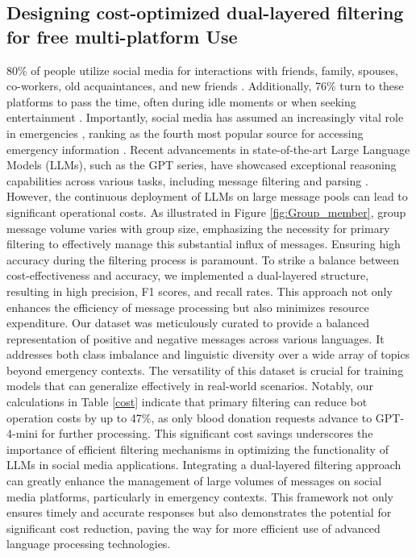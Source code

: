 \documentclass[11pt]{article}
\begin{document}
\subsection{Designing cost-optimized dual-layered filtering for free multi-platform Use}
 80\% of people utilize social media for interactions with friends, family, spouses, co-workers, old acquaintances, and new friends \cite{28whiting2013people}. Additionally, 76\% turn to these platforms to pass the time, often during idle moments or when seeking entertainment \cite{28whiting2013people}. Importantly, social media has assumed an increasingly vital role in emergencies \cite{29lindsay2011social}, ranking as the fourth most popular source for accessing emergency information \cite{29lindsay2011social}. Recent advancements in state-of-the-art Large Language Models (LLMs), such as the GPT series, have showcased exceptional reasoning capabilities across various tasks, including message filtering and parsing \cite{30huang2024text}. However, the continuous deployment of LLMs on large message pools can lead to significant operational costs. As illustrated in Figure \ref{fig:Group_member}, group message volume varies with group size, emphasizing the necessity for primary filtering to effectively manage this substantial influx of messages. Ensuring high accuracy during the filtering process is paramount. To strike a balance between cost-effectiveness and accuracy, we implemented a dual-layered structure, resulting in high precision, F1 scores, and recall rates. This approach not only enhances the efficiency of message processing but also minimizes resource expenditure. Our dataset was meticulously curated to provide a balanced representation of positive and negative messages across various languages. It addresses both class imbalance and linguistic diversity over a wide array of topics beyond emergency contexts. The versatility of this dataset is crucial for training models that can generalize effectively in real-world scenarios. Notably, our calculations in Table \ref{cost} indicate that primary filtering can reduce bot operation costs by up to 47\%, as only blood donation requests advance to GPT-4-mini for further processing. This significant cost savings underscores the importance of efficient filtering mechanisms in optimizing the functionality of LLMs in social media applications. Integrating a dual-layered filtering approach can greatly enhance the management of large volumes of messages on social media platforms, particularly in emergency contexts. This framework not only ensures timely and accurate responses but also demonstrates the potential for significant cost reduction, paving the way for more efficient use of advanced language processing technologies.
\end{document}
